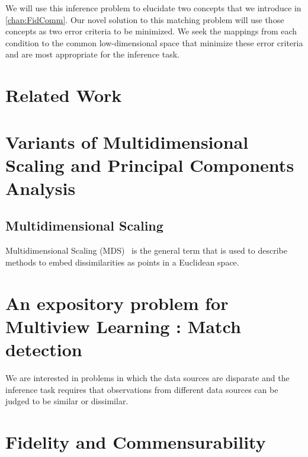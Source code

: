 \documentclass[12pt,oneside,final]{thesis}\usepackage[]{graphicx}\usepackage[]{color}
\begin{document}
We will use this inference problem to elucidate two concepts that we introduce  in \autoref{chap:FidComm}. Our novel solution to this matching problem will use those concepts as two error criteria to be minimized. We seek the mappings from each condition to the common low-dimensional space that minimize these error criteria and are most appropriate for the inference task.



\chapter{Related Work}
\label{chap:RelatedWork}





\chapter{Variants of Multidimensional Scaling and Principal Components Analysis}
\label{sec:MDS}



\section{Multidimensional Scaling}
Multidimensional Scaling (MDS)~\cite{CMDS,borg+groenen:1997,duin2005dissimilarity}  is the general term that is used to describe methods to    embed dissimilarities as points in a Euclidean space. 



\chapter{An expository problem for Multiview Learning : Match detection}
\label{chap:match_detection}

 We are interested in problems in which the data sources are disparate and the inference task requires that observations from different data sources can be judged to be similar or dissimilar.
  











\chapter{Fidelity and Commensurability}
\label{chap:FidComm}
\end{document}
